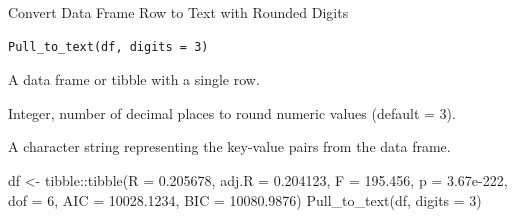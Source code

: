 \documentclass[a4paper]{book}
\begin{document}
%
\begin{Description}
Convert Data Frame Row to Text with Rounded Digits
\end{Description}
%
\begin{Usage}
\begin{verbatim}
Pull_to_text(df, digits = 3)
\end{verbatim}
\end{Usage}
%
\begin{Arguments}
\begin{ldescription}
\item[\code{df}] A data frame or tibble with a single row.

\item[\code{digits}] Integer, number of decimal places to round numeric values (default = 3).
\end{ldescription}
\end{Arguments}
%
\begin{Value}
A character string representing the key-value pairs from the data frame.
\end{Value}
%
\begin{Examples}
\begin{ExampleCode}
df <- tibble::tibble(R = 0.205678, adj.R = 0.204123, F = 195.456, p = 3.67e-222, dof = 6, AIC = 10028.1234, BIC = 10080.9876)
Pull_to_text(df, digits = 3)
\end{ExampleCode}
\end{Examples}
\end{document}
